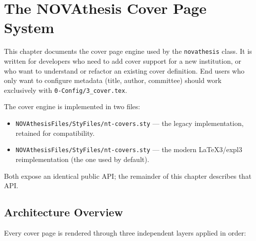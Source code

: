 

%

\chapter{The NOVAthesis Cover Page System}
\label{cha:covers}

This chapter documents the cover page engine used by the \texttt{novathesis}
class.  It is written for developers who need to add cover support for a new
institution, or who want to understand or refactor an existing cover
definition.  End users who only want to configure metadata (title, author,
committee) should work exclusively with \verb!0-Config/3_cover.tex!.

The cover engine is implemented in two files:
\begin{itemize}
  \item \verb!NOVAthesisFiles/StyFiles/nt-covers.sty! — the legacy
        implementation, retained for compatibility.
  \item \verb!NOVAthesisFiles/StyFiles/nt-covers.sty! — the modern
        \LaTeX3/expl3 reimplementation (the one used by default).
\end{itemize}
Both expose an identical public API; the remainder of this chapter describes
that API.


\section{Architecture Overview}
\label{sec:covers_arch}

Every cover page is rendered through three independent layers applied in
order:

